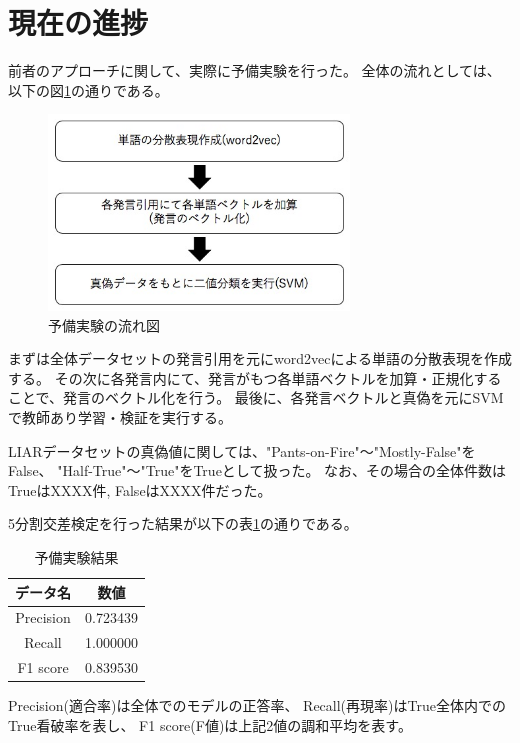 \documentclass[twocolumn, a4paper, uplatex]{UECIEresume}
\begin{document}
\section{現在の進捗}
前者のアプローチに関して、実際に予備実験を行った。
全体の流れとしては、以下の図\ref{fig:nagare}の通りである。

\begin{figure}[h]
  \begin{center}
    \includegraphics[width=8cm]{fig1.jpg}
    \caption{予備実験の流れ図}
    \label{fig:nagare}
  \end{center}
\end{figure}

まずは全体データセットの発言引用を元にword2vecによる単語の分散表現を作成する。
その次に各発言内にて、発言がもつ各単語ベクトルを加算・正規化することで、発言のベクトル化を行う。
最後に、各発言ベクトルと真偽を元にSVMで教師あり学習・検証を実行する。

LIARデータセットの真偽値に関しては、"Pants-on-Fire"〜"Mostly-False"をFalse、
"Half-True"〜"True"をTrueとして扱った。
なお、その場合の全体件数はTrueはXXXX件, FalseはXXXX件だった。

5分割交差検定を行った結果が以下の表\ref{tb:result}の通りである。

\begin{table}[h]
  \begin{center}
    \caption{予備実験結果}
    \label{tb:result}
    \begin{tabular}{c c}
      \hline
      データ名 & 数値 \\
      \hline \hline
      Precision & 0.723439 \\
      Recall & 1.000000 \\
      F1 score & 0.839530 \\
      \hline
    \end{tabular}
  \end{center}
\end{table}

Precision(適合率)は全体でのモデルの正答率、
Recall(再現率)はTrue全体内でのTrue看破率を表し、
F1 score(F値)は上記2値の調和平均を表す。
\end{document}
